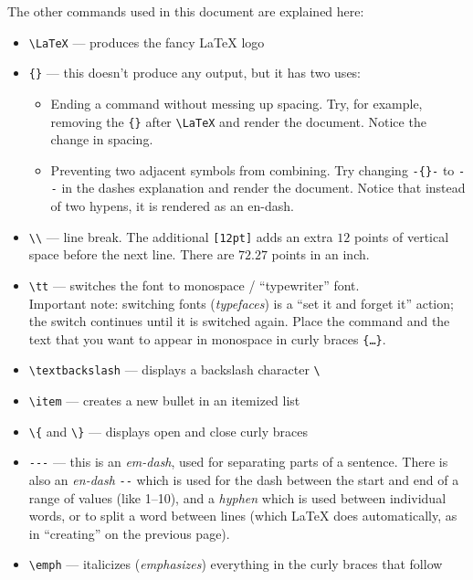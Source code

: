 \documentclass{article}
\begin{document}
The other commands used in this document are explained here:
\begin{itemize}
  \item {\tt \textbackslash LaTeX} --- produces the fancy \LaTeX{} logo
  \item {\tt \{\}} --- this doesn't produce any output, but it has two uses:
    \begin{itemize}
      \item Ending a command without messing up spacing. Try, for example,
      removing the {\tt \{\}} after {\tt \textbackslash LaTeX} and render the
      document. Notice the change in spacing.
      \item Preventing two adjacent symbols from combining. Try changing
      {\tt -\{\}-} to {\tt -{}-} in the dashes explanation and render the
      document. Notice that instead of two hypens, it is rendered as an en-dash.
    \end{itemize}
  \item {\tt \textbackslash\textbackslash} --- line break. The additional
  {\tt [12pt]} adds an extra $12$ points of vertical space before the next
  line. There are $72.27$ points in an inch.
  \item {\tt \textbackslash tt} --- switches the font to monospace /
  ``typewriter'' font.\\ Important note: switching fonts (\emph{typefaces}) is a
  ``set it and forget it'' action; the switch continues until it is switched
  again. Place the command and the text that you want to appear in monospace
  in curly braces {\tt \{\ldots\}}.
  \item {\tt \textbackslash textbackslash} --- displays a backslash character
  {\tt \textbackslash}
  \item {\tt \textbackslash item} --- creates a new bullet in an itemized list
  \item {\tt \textbackslash \{} and {\tt \textbackslash \}} --- displays open
  and close curly braces
  \item {\tt -{}-{}-} --- this is an \emph{em-dash}, used for separating parts
  of a sentence. There is also an \emph{en-dash} {\tt -{}-} which is used for
  the dash between the start and end of a range of values (like 1--10), and a
  \emph{hyphen} which is used between individual words, or to split a word
  between lines (which \LaTeX{} does automatically, as in ``creating''
  on the previous page).
  \item {\tt \textbackslash emph} --- italicizes (\emph{emphasizes}) everything
  in the curly braces that follow

\end{itemize}
\end{document}

